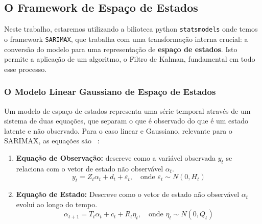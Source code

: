 \documentclass[ 12pt,a4paper ]{article} %
\begin{document}
	
	
	\subsection{O Framework de Espaço de Estados}
	
	Neste trabalho, estaremos utilizando a bilioteca python  \texttt{statsmodels} onde temos o framework \texttt{SARIMAX}, que trabalha com uma transformação interna crucial: a conversão do modelo para uma representação de \textbf{espaço de estados}. Isto permite a aplicação de um algoritmo, o Filtro de Kalman, fundamental em todo esse processo.
	
	\subsubsection{O Modelo Linear Gaussiano de Espaço de Estados}
	
	Um modelo de espaço de estados representa uma série temporal através de um sistema de duas equações, que separam o que é observado do que é um estado latente e não observado. Para o caso linear e Gaussiano, relevante para o SARIMAX, as equações são ~\cite{Koopman}:
	
	\begin{enumerate}
		\item \textbf{Equação de Observação:} descreve como a variável observada $y_t$ se relaciona com o vetor de estado não observável $\alpha_t$.
		\[ y_t = Z_t \alpha_t + d_t + \varepsilon_t, \quad \text{onde } \varepsilon_t \sim N(0, H_t) \]
		
		\item \textbf{Equação de Estado:} Descreve como o vetor de estado não observável $\alpha_t$ evolui ao longo do tempo.
		$$\alpha_{t+1}= T_t\alpha_t+c_t+R_t\eta_t, \quad \text{onde } \eta_t \sim N(0, Q_t)$$
	\end{enumerate}
	
\end{document}
